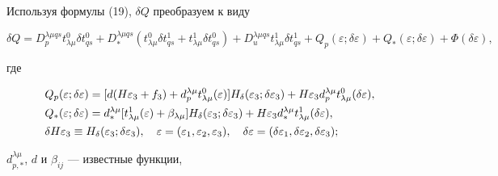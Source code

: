 Используя формулы (19), $\delta Q$ преобразуем к виду 


\begin{equation} 


\delta Q=D^{\lambda\mu qs}_p t^0_{\lambda\mu}\delta t^0_{qs}+ 


D^{\lambda\mu qs}_*(t^0_{\lambda\mu} 


\delta t^1_{qs}+t^1_{\lambda\mu}\delta t^0_{qs})+ 


D^{\lambda\mu qs}_u t^1_{\lambda\mu}\delta t^1_{qs} 


+Q_p(\varepsilon;\delta\varepsilon)+Q_*(\varepsilon;\delta\varepsilon) 


+\Phi(\delta\varepsilon), 


\end{equation} 


где 


\begin{align} 


&Q_p(\varepsilon;\delta\varepsilon)=[d(H\varepsilon_3+f_3)+ 


d^{\lambda\mu}_p t^0_{\lambda\mu}(\varepsilon)]H_\delta 


(\varepsilon_3;\delta\varepsilon_3)+ 


H\varepsilon_3 d^{\lambda\mu}_p 


t^0_{\lambda\mu}(\delta\varepsilon), \\ 


%


&Q_*(\varepsilon;\delta\varepsilon)=d^{\lambda\mu}_* 


[t^1_{\lambda\mu}(\varepsilon)+\beta_{\lambda\mu}]H_\delta 


(\varepsilon_3;\delta\varepsilon_3)+H\varepsilon_3 


d^{\lambda\mu}_* t^1_{\lambda\mu}(\delta\varepsilon), \\


%


&\delta H\varepsilon_3\equiv H_\delta(\varepsilon_3;\delta\varepsilon_3), 


\quad \varepsilon=(\varepsilon_1,\varepsilon_2,\varepsilon_3),\quad 


\delta\varepsilon=(\delta\varepsilon_1,\delta\varepsilon_2, 


\delta\varepsilon_3); \notag


\end{align} 


$d^{\lambda\mu}_{p,*}$, $d$ и $\beta_{ij}$ --- известные функции, 



